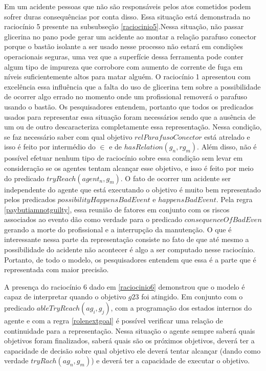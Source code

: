 Em um acidente pessoas que não são responsáveis pelos atos cometidos podem sofrer duras consequências por conta disso. Essa situação está demonstrada no raciocínio 5 presente na subsubseção \ref{raciocinio5}.Nessa situação, não passar glicerina no pano pode gerar um acidente ao montar a relação parafuso conector porque o bastão isolante a ser usado nesse  processo não estará em condições operacionais seguras, uma vez que a superfície dessa ferramenta pode 
conter algum tipo de impureza que corrobore com aumento de corrente de fuga em níveis suficientemente altos para matar alguém. O raciocínio 1 apresentou com excelência essa influência que a falta do uso de glicerina tem sobre a possibilidade de ocorrer algo errado no momento onde um profissional removerá o parafuso usando o bastão. Os pesquisadores entendem, portanto que todos os predicados usados para representar essa situação foram necessários sendo que a ausência de um ou de outro descaracteriza completamente essa representação. Nessa condição, se faz necessário saber com qual objetivo $relParafusoConector$ está atrelado e isso é feito por intermédio do $\in$ e de $hasRelation(g_n,rg_m)$. Além disso, não é possível efetuar nenhum tipo de raciocínio sobre essa condição sem levar em consideração se os agentes tentam alcançar esse objetivo, e isso é feito por meio do predicado $tryReach(agent_n,g_m)$. O fato de ocorrer um acidente ser independente do agente que está executando o objetivo é muito bem representado pelos predicados $possibilityHappensBadEvent$ e $happensBadEvent$. Pela regra \ref{paybutiamnotguilty}, essa reunião de fatores em conjunto com os riscos associados ao evento dão como verdade para o predicado $consequenceOfBadEven$ gerando a morte do profissional e a interrupção da manutenção. O que é interessante nessa parte da representação consiste no fato de que até mesmo a possibilidade do acidente não acontecer é algo a ser computado nesse raciocínio. Portanto, de todo o modelo, os pesquisadores entendem que essa é a parte que é representada com maior precisão. 

A presença do raciocínio 6 dado em \ref{raciocinio6} demonstrou que o modelo é capaz de interpretar quando o objetivo $g23$ foi atingido. Em conjunto com o predicado $ableTryReach(ag_i,g_j)$, com a programação dos estados internos do agente e com a regra \ref{rolenextgoal} é possível verificar uma relação de continuidade para a representação. Nessa situação o agente sempre saberá quais objetivos foram finalizados, saberá quais são os próximos objetivos, deverá ter a capacidade de decisão sobre qual objetivo ele deverá tentar alcançar (dando como verdade $tryRach(ag_n,g_m)$) e deverá ter a capacidade de executar o objetivo. 

